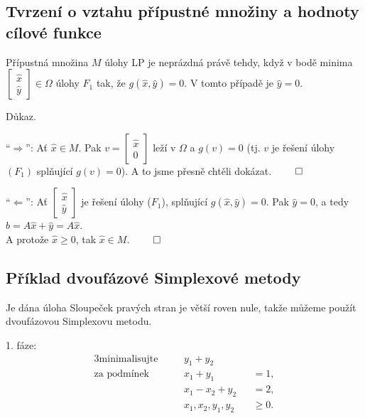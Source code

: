 \subsection{Tvrzení o vztahu přípustné množiny a hodnoty cílové funkce}
Přípustná množina $M$ úlohy LP je neprázdná právě tehdy, když v bodě minima 
$\begin{bmatrix} \hat x \\ \hat y \end{bmatrix} \in \Omega$ úlohy $F_1$ tak, že $g(\hat x, \hat y) = 0$.
V tomto případě je $\hat y = 0$.

Důkaz.

\enquote{$\Rightarrow$}: Ať $\hat x \in M$. Pak $v = \begin{bmatrix} \hat x \\ 0 \end{bmatrix}$ leží v $\Omega$ a 
$g(v) = 0$ (tj. $v$ je řešení úlohy $(F_1)$ splňující $g(v) = 0$). A to jsme přesně chtěli dokázat. $\qed$

\enquote{$\Leftarrow$}: Ať $\begin{bmatrix} \hat x \\ \hat y \end{bmatrix}$ je řešení úlohy ($F_1$), splňující 
$g(\hat x, \hat y) = 0$. Pak $\hat y = 0$, a tedy $b = A \hat x + \hat y = A \hat x$. \\ A protože $\hat x \geq 0$, tak 
$\hat x \in M$. $\qed$

\subsection{Příklad dvoufázové Simplexové metody}
Je dána úloha
Sloupeček pravých stran je větší roven nule, takže můžeme použít dvoufázovou Simplexovu metodu.

1. fáze:
\begin{alignat*}{3}
    \text{minimalisujte} &&  y_1 + y_2  &&      \\
    \text{za podmínek } &\quad&  x_1 + y_1  && {}= 1, \\
                        &\quad&  x_1 - x_2 + y_2 && {}= 2, \\
                        &\quad&  x_1, x_2, y_1, y_2 && {}\geq 0.
\end{alignat*}

